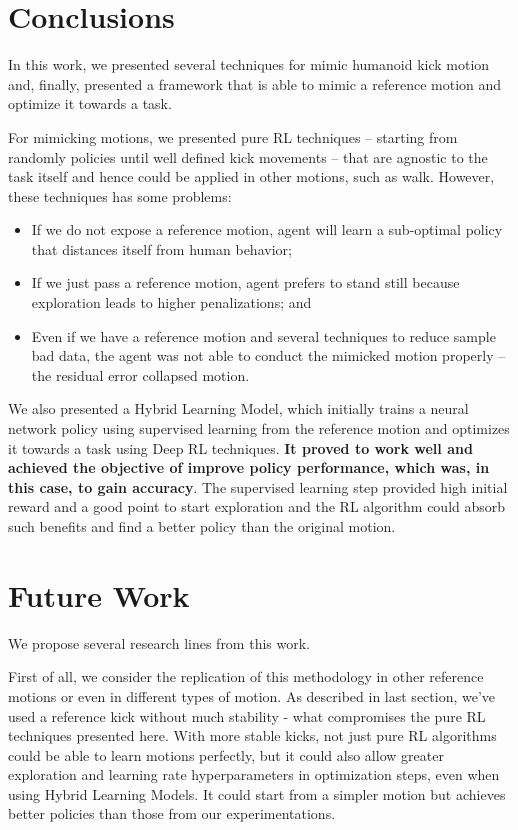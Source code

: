 \section{Conclusions}
In this work, we presented several techniques for mimic humanoid kick motion and, finally, presented a framework that is able to mimic a reference motion and optimize it towards a task.

For mimicking motions, we presented pure RL techniques -- starting from randomly policies until well defined kick movements -- that are agnostic to the task itself and hence could be applied in other motions, such as walk. However, these techniques has some problems:

\begin{itemize}
	\item If we do not expose a reference motion, agent will learn a sub-optimal policy that distances itself from human behavior;
	\item If we just pass a reference motion, agent prefers to stand still because exploration leads to higher penalizations; and
	\item Even if we have a reference motion and several techniques to reduce sample bad data, the agent was not able to conduct the mimicked motion properly -- the residual error collapsed motion.
\end{itemize}



We also presented a Hybrid Learning Model, which initially trains a neural network policy using supervised learning from the reference motion and optimizes it towards a task using Deep RL techniques. \textbf{It proved to work well and achieved the objective of improve policy performance, which was, in this case, to gain accuracy}. The supervised learning step provided high initial reward and a good point to start exploration and the RL algorithm could absorb such benefits and find a better policy than the original motion.

\section{Future Work}

We propose several research lines from this work.

First of all, we consider the replication of this methodology in other reference motions or even in different types of motion. As described in last section, we've used a reference kick without much stability - what compromises the pure RL techniques presented here. With more stable kicks, not just pure RL algorithms could be able to learn motions perfectly, but it could also allow greater exploration and learning rate hyperparameters in optimization steps, even when using Hybrid Learning Models. It could start from a simpler motion but achieves better policies than those from our experimentations.

